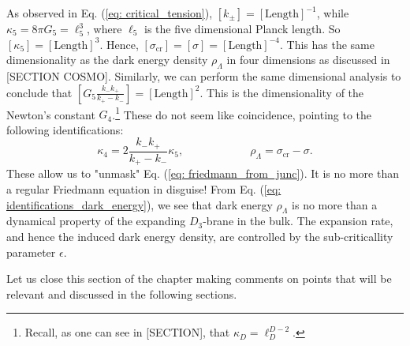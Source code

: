 \documentclass[12pt, a4paper]{article} %
\begin{document}
As observed in Eq. (\ref{eq: critical_tension}), $[k_{\pm}] = [\text{Length}]^{-1}$, while $\kappa_{5} = 8 \pi G_{5} = \ell_{5}^{3}$, where $\ell_{5}$ is the five dimensional Planck length. So $[\kappa_{5}] = [\text{Length}]^{3}$. Hence, $[\sigma_{\text{cr}}] = [\sigma] = [\text{Length}]^{-4}$. This has the same dimensionality as the dark energy density $\rho_{\Lambda}$ in four dimensions as discussed in [SECTION COSMO]. Similarly, we can perform the same dimensional analysis to conclude that $\left[G_{5} \tfrac{k_{-}k_{+}}{k_{+} - k_{-}}\right] = [\text{Length}]^{2}$. This is the dimensionality of the Newton's constant $G_{4}$.\footnote{Recall, as one can see in [SECTION], that $\kappa_{D} = \ell^{D-2}_{D}$.} These do not seem like coincidence, pointing to the following identifications:
\begin{equation}\label{eq: identifications_dark_energy}
	\kappa_{4} = 2 \frac{k_{-}k_{+}}{k_{+} - k_{-}} \kappa_{5}, \qquad \qquad \qquad \rho_{\Lambda} = \sigma_{\text{cr}} - \sigma.
\end{equation}
These allow us to "unmask" Eq. (\ref{eq: friedmann_from_junc}). It is no more than a regular Friedmann equation in disguise! From Eq. (\ref{eq: identifications_dark_energy}), we see that dark energy $\rho_{\Lambda}$ is no more than a dynamical property of the expanding $D_{3}$-brane in the bulk. The expansion rate, and hence the induced dark energy density, are controlled by the sub-criticallity parameter $\epsilon$. 

Let us close this section of the chapter making comments on points that will be relevant and discussed in the following sections.
\end{document}
